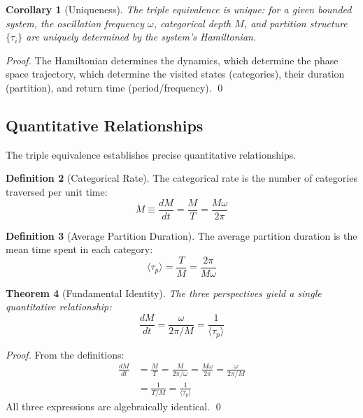 \documentclass[twocolumn,10pt]{article}
\newtheorem{theorem}{Theorem}[section]
\newtheorem{corollary}[theorem]{Corollary}
\theoremstyle{definition}
\newtheorem{definition}[theorem]{Definition}
\theoremstyle{remark}
\begin{document}
\begin{corollary}[Uniqueness]
\label{cor:uniqueness}
The triple equivalence is unique: for a given bounded system, the oscillation frequency $\omega$, categorical depth $M$, and partition structure $\{\tau_i\}$ are uniquely determined by the system's Hamiltonian.
\end{corollary}

\begin{proof}
The Hamiltonian determines the dynamics, which determine the phase space trajectory, which determine the visited states (categories), their duration (partition), and return time (period/frequency). \qed
\end{proof}

\subsection{Quantitative Relationships}

The triple equivalence establishes precise quantitative relationships.

\begin{definition}[Categorical Rate]
\label{def:cat_rate}
The categorical rate is the number of categories traversed per unit time:
\begin{equation}
\dot{M} \equiv \frac{dM}{dt} = \frac{M}{T} = \frac{M\omega}{2\pi}
\end{equation}
\end{definition}

\begin{definition}[Average Partition Duration]
\label{def:avg_partition}
The average partition duration is the mean time spent in each category:
\begin{equation}
\langle\tau_p\rangle = \frac{T}{M} = \frac{2\pi}{M\omega}
\end{equation}
\end{definition}

\begin{theorem}[Fundamental Identity]
\label{thm:fundamental}
The three perspectives yield a single quantitative relationship:
\begin{equation}
\boxed{\frac{dM}{dt} = \frac{\omega}{2\pi/M} = \frac{1}{\langle\tau_p\rangle}}
\label{eq:fundamental}
\end{equation}
\end{theorem}

\begin{proof}
From the definitions:
\begin{align}
\frac{dM}{dt} &= \frac{M}{T} = \frac{M}{2\pi/\omega} = \frac{M\omega}{2\pi} = \frac{\omega}{2\pi/M} \\
&= \frac{1}{T/M} = \frac{1}{\langle\tau_p\rangle}
\end{align}
All three expressions are algebraically identical. \qed
\end{proof}
\end{document}
